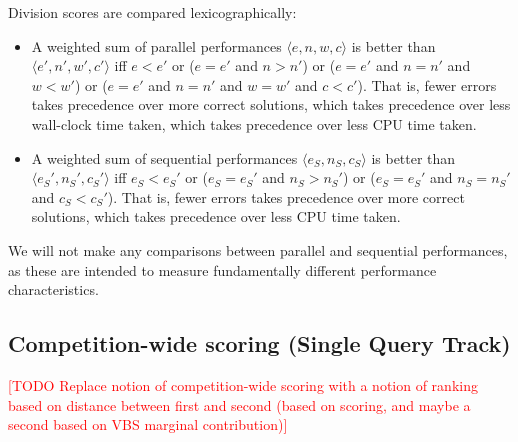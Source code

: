 \documentclass[12pt]{article}
\newcommand{\rem}[1]{\textcolor{red}{[#1]}}
\newcommand{\todo}[1]{\rem{TODO #1}}
\newcommand{\main}{Single Query\xspace}
\begin{document}
Division scores are compared lexicographically:
\begin{itemize}
\item A weighted sum of parallel performances $\langle e, n, w, c\rangle$ is
  better than $\langle e', n', w', c'\rangle$ iff $e < e'$ or ($e =
  e'$ and $n > n'$) or ($e = e'$ and $n = n'$ and $w < w'$) or ($e =
  e'$ and $n = n'$ and $w = w'$ and $c < c'$).  That is, fewer errors
  takes precedence over more correct solutions, which takes precedence
  over less wall-clock time taken, which takes precedence over less
  CPU time taken.
\item A weighted sum of sequential performances $\langle e_S, n_S,
  c_S\rangle$ is better than $\langle e_S', n_S', c_S'\rangle$ iff
  $e_S < e_S'$ or ($e_S = e_S'$ and $n_S > n_S'$) or ($e_S = e_S'$ and
  $n_S = n_S'$ and $c_S < c_S'$).  That is, fewer errors takes
  precedence over more correct solutions, which takes precedence over
  less CPU time taken.
\end{itemize}
%
We will not make any comparisons between parallel and sequential
performances, as these are intended to measure fundamentally different
performance characteristics.

\subsection{Competition-wide scoring (\main Track)}
\label{sec:competition-wide}

\todo{Replace notion of competition-wide scoring with a notion of ranking
based on distance between first and second (based on scoring, and maybe a second
based on VBS marginal contribution)}
\end{document}

